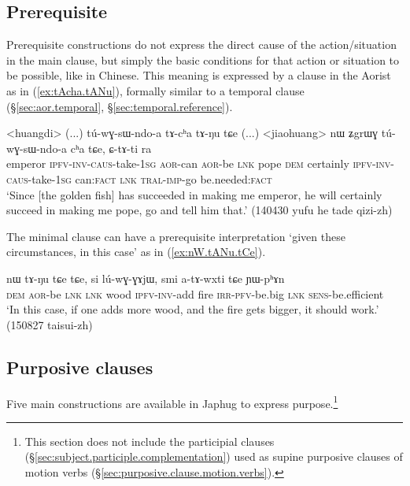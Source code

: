 \subsection{Prerequisite} \label{sec:prerequisite.clause}
Prerequisite constructions do not express the direct cause of the action/situation in the main clause, but simply the basic conditions for that action or situation to be possible, like  in Chinese. This meaning is expressed by a clause in the Aorist as in (\ref{ex:tAcha.tANu}), formally similar to a temporal clause (§\ref{sec:aor.temporal}, §\ref{sec:temporal.reference}).

\begin{exe}
\ex \label{ex:tAcha.tANu}
\gll <huangdi> (...) tú-wɣ-sɯ-ndo-a tɤ-cʰa tɤ-ŋu tɕe (...) <jiaohuang> nɯ ʑgrɯɣ tú-wɣ-sɯ-ndo-a cʰa tɕe, ɕ-tɤ-ti ra \\
emperor {  } \textsc{ipfv}-\textsc{inv}-\textsc{caus}-take-\textsc{1sg} \textsc{aor}-can \textsc{aor}-be \textsc{lnk} {  } pope \textsc{dem} certainly \textsc{ipfv}-\textsc{inv}-\textsc{caus}-take-\textsc{1sg} can:\textsc{fact} \textsc{lnk} \textsc{tral}-\textsc{imp}-go be.needed:\textsc{fact} \\
\glt `Since [the golden fish] has succeeded in making me emperor, he will certainly succeed in making me pope, go and tell him that.' (140430 yufu he tade qizi-zh)
\end{exe}

The minimal clause  can have a prerequisite interpretation `given these circumstances, in this case' as in (\ref{ex:nW.tANu.tCe}).

\begin{exe}
\ex \label{ex:nW.tANu.tCe}
\gll nɯ tɤ-ŋu tɕe tɕe, si lú-wɣ-ɣɤjɯ, smi a-tɤ-wxti tɕe ɲɯ-pʰɤn \\
\textsc{dem} \textsc{aor}-be \textsc{lnk} \textsc{lnk} wood \textsc{ipfv}-\textsc{inv}-add fire \textsc{irr}-\textsc{pfv}-be.big \textsc{lnk} \textsc{sens}-be.efficient \\
\glt `In this case, if one adds more wood, and the fire gets bigger, it should work.' (150827 taisui-zh)
\end{exe}


 \subsection{Purposive clauses} \label{sec:purposive.clauses}
 Five main constructions are available in Japhug to express purpose.\footnote{This section does not include the  participial clauses (§\ref{sec:subject.participle.complementation}) used as supine purposive clauses of motion verbs  (§\ref{sec:purposive.clause.motion.verbs}).
 }

